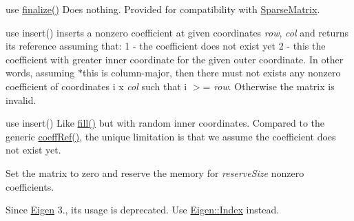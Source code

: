 \begin{DoxyRefList}
%
use \mbox{\hyperlink{class_eigen_1_1_dynamic_sparse_matrix_a74b03c99d9d852888038be338995f1b9}{finalize()}} Does nothing. Provided for compatibility with \mbox{\hyperlink{class_eigen_1_1_sparse_matrix}{Sparse\+Matrix}}.  
\item[Member \mbox{\hyperlink{class_eigen_1_1_dynamic_sparse_matrix_a4c66f2b97c6aad9e0ec0a56eaea5994d}{Eigen::Dynamic\+Sparse\+Matrix::fill}} (Index row, Index col)]\label{deprecated__deprecated000042}%
%
use insert() inserts a nonzero coefficient at given coordinates {\itshape row}, {\itshape col} and returns its reference assuming that\+: 1 -\/ the coefficient does not exist yet 2 -\/ this the coefficient with greater inner coordinate for the given outer coordinate. In other words, assuming {\ttfamily $\ast$this} is column-\/major, then there must not exists any nonzero coefficient of coordinates {\ttfamily i} {\ttfamily x} {\itshape col} such that {\ttfamily i} $>$= {\itshape row}. Otherwise the matrix is invalid. 
\item[Member \mbox{\hyperlink{class_eigen_1_1_dynamic_sparse_matrix_a51e88454dac0a742bc9809869330dd47}{Eigen::Dynamic\+Sparse\+Matrix::fillrand}} (Index row, Index col)]\label{deprecated__deprecated000043}%
%
use insert() Like \mbox{\hyperlink{class_eigen_1_1_dynamic_sparse_matrix_a4c66f2b97c6aad9e0ec0a56eaea5994d}{fill()}} but with random inner coordinates. Compared to the generic \mbox{\hyperlink{class_eigen_1_1_dynamic_sparse_matrix_a6b4e685fdb64e1e5699e9f26f720f973}{coeff\+Ref()}}, the unique limitation is that we assume the coefficient does not exist yet.  
\item[Member \mbox{\hyperlink{class_eigen_1_1_dynamic_sparse_matrix_ae23e926cc32bfbaeef4880db0f6082e8}{Eigen::Dynamic\+Sparse\+Matrix::start\+Fill}} (Index reserve\+Size=1000)]\label{deprecated__deprecated000041}%
%
 Set the matrix to zero and reserve the memory for {\itshape reserve\+Size} nonzero coefficients.  
\item[Member \mbox{\hyperlink{struct_eigen_1_1_eigen_base_a554f30542cc2316add4b1ea0a492ff02}{Eigen::Eigen\+Base$<$ Derived $>$::Index}} ]\label{deprecated__deprecated000006}%
%
Since \mbox{\hyperlink{namespace_eigen}{Eigen}} 3., its usage is deprecated. Use \mbox{\hyperlink{namespace_eigen_a62e77e0933482dafde8fe197d9a2cfde}{Eigen\+::\+Index}} instead.  
\item[Member \mbox{\hyperlink{class_eigen_1_1_eigen_solver_a5bff6a6bc0efac67d52c60c2c3deb9ee}{Eigen::Eigen\+Solver$<$ \+\_\+\+Matrix\+Type $>$::Index}} ]\label{deprecated__deprecated000018}%

\end{DoxyRefList}
